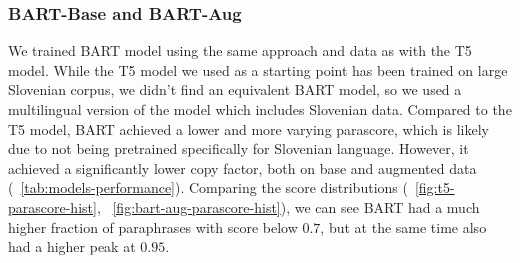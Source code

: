\documentclass[fleqn,moreauthors,10pt]{ds_report}
\begin{document}
\subsubsection{BART-Base and BART-Aug}

We trained BART model using the same approach and data as with the T5 model. While the T5 model we used as a starting point has been trained on large Slovenian corpus, we didn't find an equivalent BART model, so we used a multilingual version of the model which includes Slovenian data. Compared to the T5 model, BART achieved a lower and more varying parascore, which is likely due to not being pretrained specifically for Slovenian language. However, it achieved a significantly lower copy factor, both on base and augmented data (\tablename~\ref{tab:models-performance}). Comparing the score distributions (\figurename~\ref{fig:t5-parascore-hist}, \figurename~\ref{fig:bart-aug-parascore-hist}), we can see BART had a much higher fraction of paraphrases with score below $0.7$, but at the same time also had a higher peak at $0.95$.
\end{document}
